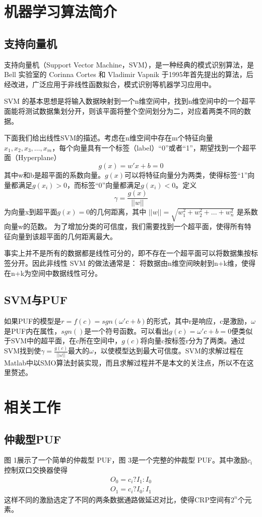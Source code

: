 \section{机器学习算法简介}
\subsection{支持向量机}
支持向量机（Support Vector Machine，SVM），是一种经典的模式识别算法，是 Bell 实验室的 Corinna Cortes 和 Vladimir Vapnik 于1995年首先提出的算法，后经改进，广泛应用于非线性函数拟合，模式识别等机器学习应用中。

SVM 的基本思想是将输入数据映射到一个n维空间中，找到n维空间中的一个超平面能将测试数据集划分开，则该平面将整个空间划分为二，对应着两类不同的数据。

下面我们给出线性SVM的描述。考虑在n维空间中存在m个特征向量$ x_1,x_2,x_3,…,x_m $，每个向量具有一个标签（label）``0''或者``1''，期望找到一个超平面（Hyperplane）
\begin{equation}
g(x)=w'x+b=0
\end{equation}
其中w和b是超平面的系数向量。$ g(x) $可以将特征向量分为两类，使得标签``1''向量都满足$ g(x_i )>0 $，而标签``0''向量都满足$ g(x_i )<0 $。定义
\begin{equation}
\gamma=\frac{g(x)}{||w||}
\end{equation}
为向量x到超平面$ g(x)=0 $的几何距离，其中
$ ||w||=\sqrt{w_1^2+w_2^2+...+w_n^2} $
是系数向量w的范数。
为了增加分类的可信度，我们需要找到一个超平面，使得所有特征向量到该超平面的几何距离最大。

事实上并不是所有的数据都是线性可分的，即不存在一个超平面可以将数据集按标签分开。因此非线性 SVM 的做法通常是：
将数据由n维空间映射到n+k维，使得在n+k为空间中数据线性可分。
\subsection{SVM与PUF}
如果PUF的模型是$ r=f(c)=sgn(\omega'c+b) $的形式，其中r是响应，c是激励，$ \omega $是PUF内在属性，$ sgn() $是一个符号函数。可以看出$ g(c)=\omega'c+b=0 $便类似于SVM中的超平面，在c所在空间中，$ g(c) $将向量c按标签r分为了两类。通过SVM找到使$ \gamma=\frac{g(c)}{||\omega||} $最大的$ \omega $，以使模型达到最大可信度。SVM的求解过程在Matlab中以SMO算法封装实现，而且求解过程并不是本文的关注点，所以不在这里赘述。
\section{相关工作}
\subsection{仲裁型PUF}
图 1展示了一个简单的仲裁型 PUF，图 3是一个完整的仲裁型 PUF。其中激励$ c_i $控制双口交换器使得
\begin{eqnarray}
O_0=c_i?I_1:I_0\\
O_1=c_i?I_0:I_1
\end{eqnarray}
这样不同的激励选定了不同的两条数据通路做延迟对比，使得CRP空间有$ 2^n $个元素。
 
